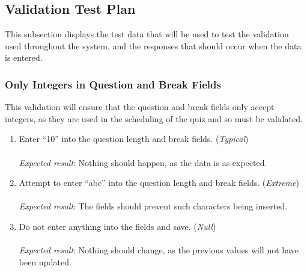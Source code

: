 \subsection{Validation Test Plan} %
\label{sub:validation_testing}
This subsection displays the test data that will be used to test the validation used throughout the system, and the responses that should occur when the data is entered.

\subsubsection{Only Integers in Question and Break Fields} %
\label{ssub:only_numbers_in_question_and_break_fields}
This validation will ensure that the question and break fields only accept integers, as they are used in the scheduling of the quiz and so must be validated.
\begin{enumerate}[leftmargin=*]
  \item Enter ``10'' into the question length and break fields. (\textit{Typical})\\\\
  \textit{Expected result}: Nothing should happen, as the data is as expected.\\

  \item Attempt to enter ``abc'' into the question length and break fields. (\textit{Extreme})\\\\
  \textit{Expected result}: The fields should prevent such characters being inserted.\\

  \item Do not enter anything into the fields and save. (\textit{Null})\\\\
  \textit{Expected result}: Nothing should change, as the previous values will not have been updated.\\
\end{enumerate}

